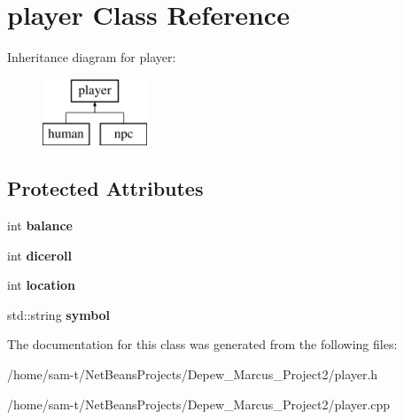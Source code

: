 \hypertarget{classplayer}{}\section{player Class Reference}
\label{classplayer}
Inheritance diagram for player\+:\begin{figure}[H]
\begin{center}
\leavevmode
\includegraphics[height=2.000000cm]{classplayer}
\end{center}
\end{figure}
\subsection*{Protected Attributes}
\begin{DoxyCompactItemize}
\item 
\mbox{\label{classplayer_a6c21884db536a0f0ac243e3cd2e95c88}} 
int {\bfseries balance}
\item 
\mbox{\label{classplayer_a617fb256c2de4d68a5ad18d6ac4eec1a}} 
int {\bfseries diceroll}
\item 
\mbox{\label{classplayer_ac9cabd107e704ab09458e5e17f231e85}} 
int {\bfseries location}
\item 
\mbox{\label{classplayer_ad22cc62b85090b4f0cd4a0618194b6fa}} 
std\+::string {\bfseries symbol}
\end{DoxyCompactItemize}


The documentation for this class was generated from the following files\+:\begin{DoxyCompactItemize}
\item 
/home/sam-\/t/\+Net\+Beans\+Projects/\+Depew\+\_\+\+Marcus\+\_\+\+Project2/player.\+h\item 
/home/sam-\/t/\+Net\+Beans\+Projects/\+Depew\+\_\+\+Marcus\+\_\+\+Project2/player.\+cpp\end{DoxyCompactItemize}
